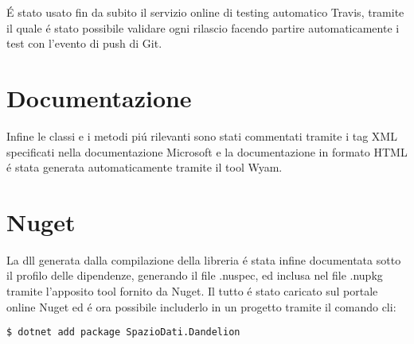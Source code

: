 \'E stato usato fin da subito il servizio online di testing automatico Travis, tramite il quale \'e stato possibile validare ogni rilascio facendo 
partire automaticamente i test con l'evento di push di Git. 

\section{Documentazione}
Infine le classi e i metodi pi\'u rilevanti sono stati commentati tramite i tag XML specificati nella documentazione Microsoft e la documentazione in formato 
HTML \'e stata generata automaticamente tramite il tool Wyam.

\section{Nuget}
La dll generata dalla compilazione della libreria \'e stata infine documentata sotto il profilo delle dipendenze, generando il file .nuspec, ed inclusa nel file .nupkg
tramite l'apposito tool fornito da Nuget. Il tutto \'e stato caricato sul portale online Nuget ed \'e ora possibile includerlo in un progetto tramite il comando cli:

\begin{lstlisting}[style=TexStyle]
$ dotnet add package SpazioDati.Dandelion
\end{lstlisting}